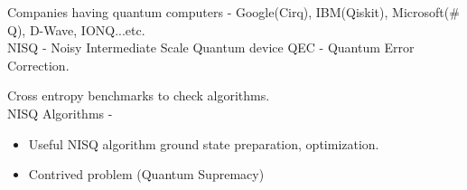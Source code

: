 \documentclass[11.5pt, paper=a4]{article}
\theoremstyle{definition}
\numberwithin{theorem}{section}
\begin{document}
Companies having quantum computers - Google(Cirq), IBM(Qiskit), Microsoft($\#$Q), D-Wave, IONQ...etc.\\


NISQ - Noisy Intermediate Scale Quantum device
QEC - Quantum Error Correction.

Cross entropy benchmarks to check algorithms.\\

NISQ Algorithms -

\begin{itemize}
    \item {Useful NISQ algorithm ground state preparation, optimization. }
    \item {Contrived problem (Quantum Supremacy)}
\end{itemize}

\medskip



\end{document}

